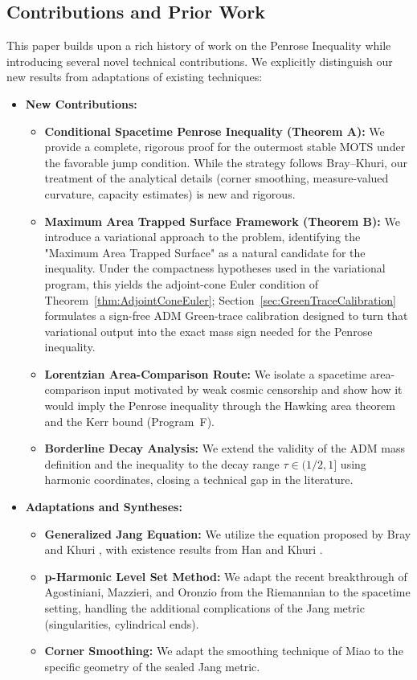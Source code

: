\subsection{Contributions and Prior Work}

This paper builds upon a rich history of work on the Penrose Inequality while introducing several novel technical contributions. We explicitly distinguish our new results from adaptations of existing techniques:

\begin{itemize}
    \item \textbf{New Contributions:}
    \begin{itemize}
        \item \textbf{Conditional Spacetime Penrose Inequality (Theorem A):} We provide a complete, rigorous proof for the outermost stable MOTS under the favorable jump condition. While the strategy follows Bray--Khuri, our treatment of the analytical details (corner smoothing, measure-valued curvature, capacity estimates) is new and rigorous.
        \item \textbf{Maximum Area Trapped Surface Framework (Theorem B):} We introduce a variational approach to the problem, identifying the "Maximum Area Trapped Surface" as a natural candidate for the inequality. Under the compactness hypotheses used in the variational program, this yields the adjoint-cone Euler condition of Theorem~\ref{thm:AdjointConeEuler}; Section~\ref{sec:GreenTraceCalibration} formulates a sign-free ADM Green-trace calibration designed to turn that variational output into the exact mass sign needed for the Penrose inequality.
        \item \textbf{Lorentzian Area-Comparison Route:} We isolate a spacetime area-comparison input motivated by weak cosmic censorship and show how it would imply the Penrose inequality through the Hawking area theorem and the Kerr bound (Program~F).
        \item \textbf{Borderline Decay Analysis:} We extend the validity of the ADM mass definition and the inequality to the decay range $\tau \in (1/2, 1]$ using harmonic coordinates, closing a technical gap in the literature.
    \end{itemize}

    \item \textbf{Adaptations and Syntheses:}
    \begin{itemize}
        \item \textbf{Generalized Jang Equation:} We utilize the equation proposed by Bray and Khuri \cite{braykhuri2010}, with existence results from Han and Khuri \cite{hankhuri2013}.
        \item \textbf{p-Harmonic Level Set Method:} We adapt the recent breakthrough of Agostiniani, Mazzieri, and Oronzio \cite{amo2024} from the Riemannian to the spacetime setting, handling the additional complications of the Jang metric (singularities, cylindrical ends).
        \item \textbf{Corner Smoothing:} We adapt the smoothing technique of Miao \cite{miao2002} to the specific geometry of the sealed Jang metric.
    \end{itemize}
\end{itemize}


